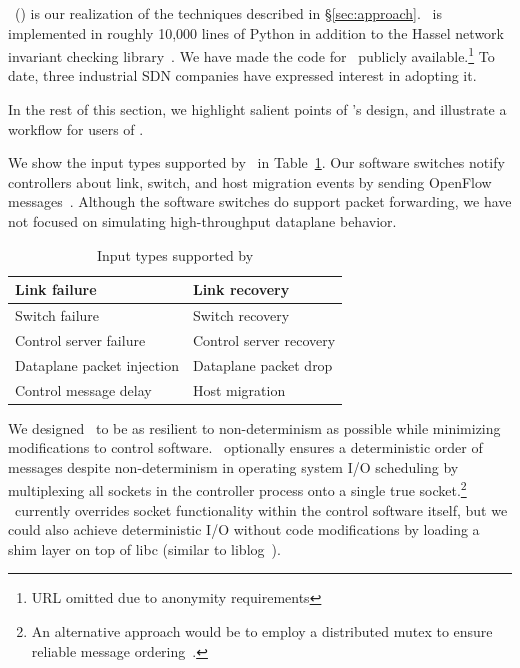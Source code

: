 \projectname~(\projectmeaning) is our realization of the techniques described in
\S\ref{sec:approach}. \projectname~is implemented in roughly 10,000 lines of Python in
addition to the Hassel network invariant checking library~\cite{hsa}. We have
made the code
for \projectname~publicly available.\footnote{URL omitted due to anonymity requirements}
To date, three industrial SDN companies have expressed interest in adopting it.

In the rest of this section, we highlight salient points of \projectname's
design, and illustrate a workflow for users of \projectname.

We show the input types supported by \projectname~in Table~\ref{tab:inputs}.
Our software switches notify controllers about link, switch, and host migration events
by sending OpenFlow messages~\cite{openflow}.
Although the software switches do support packet forwarding, we
have not focused on simulating high-throughput dataplane behavior.

\begin{table}
\centering
\begin{tabular}{|l|l|}
\hline
Link failure & Link recovery \\
\hline
Switch failure & Switch recovery \\
\hline
Control server failure & Control server recovery \\
\hline
Dataplane packet injection & Dataplane packet drop \\
\hline
Control message delay & Host migration \\
\hline
\end{tabular}
\caption{Input types supported by \projectname}
\label{tab:inputs}
\end{table}

We designed \projectname~to be as resilient to non-determinism as possible
while minimizing modifications to control software.
\projectname~optionally ensures a deterministic order of messages despite
non-determinism in operating system I/O scheduling
by multiplexing all sockets in the controller process
onto a single true socket.\footnote{An alternative approach would be to employ a
distributed mutex to ensure reliable message ordering~\cite{lin2009towards}.}
\projectname~currently
overrides socket functionality within the control software itself, but
we could also achieve deterministic I/O without code modifications by
loading a shim layer on top of
libc (similar to liblog~\cite{Geels:2006:RDD:1267359.1267386}).

